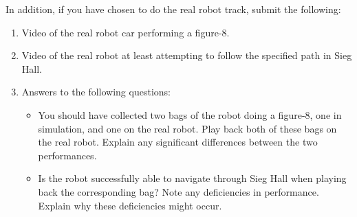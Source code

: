 \documentclass[final]{article}
\begin{document}
In addition, if you have chosen to do the real robot track, submit the following:
\begin{enumerate}
\item Video of the real robot car performing a figure-8.
\item Video of the real robot at least attempting to follow the specified path in Sieg Hall.
\item Answers to the following questions:
	\begin{itemize}
		\item You should have collected two bags of the robot doing a figure-8, one in simulation, and one on the real robot. Play back both of these bags on the real robot. Explain any significant differences between the two performances.
		\item Is the robot successfully able to navigate through Sieg Hall when playing back the corresponding bag? Note any deficiencies in performance. Explain why these deficiencies might occur.
	\end{itemize}

\end{enumerate}
\end{document}
